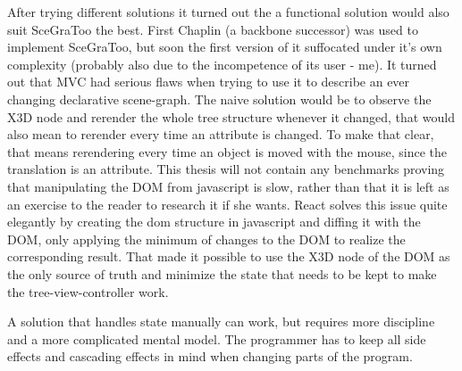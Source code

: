 After trying different solutions it turned out the a functional solution
would also suit SceGraToo the best. First Chaplin (a backbone successor)
was used to implement SceGraToo, but soon the first version of it
suffocated under it's own complexity (probably also due to the
incompetence of its user - me). It turned out that MVC had serious flaws
when trying to use it to describe an ever changing declarative
scene-graph. The naive solution would be to observe the X3D node and
rerender the whole tree structure whenever it changed, that would also
mean to rerender every time an attribute is changed. To make that clear,
that means rerendering every time an object is moved with the mouse,
since the translation is an attribute. This thesis will not contain any
benchmarks proving that manipulating the DOM from javascript is slow,
rather than that it is left as an exercise to the reader to research it
if she wants. React solves this issue quite elegantly by creating the
dom structure in javascript and diffing it with the DOM, only
applying the minimum of changes to the DOM to realize the corresponding
result. That made it possible to use the X3D node of the DOM as the only
source of truth and minimize the state that needs to be kept to make the
tree-view-controller work.

A solution that handles state manually can work, but requires more
discipline and a more complicated mental model. The programmer has to
keep all side effects and cascading effects in mind when changing parts
of the program.
